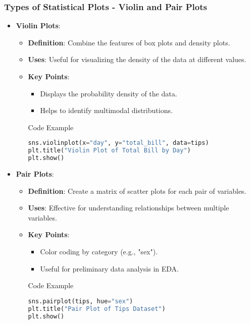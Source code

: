 \documentclass[aspectratio=169]{beamer}
\begin{document}
\begin{frame}[fragile]
    \frametitle{Types of Statistical Plots - Violin and Pair Plots}
    \begin{itemize}
        \item \textbf{Violin Plots}:
            \begin{itemize}
                \item \textbf{Definition}: Combine the features of box plots and density plots.
                \item \textbf{Uses}: Useful for visualizing the density of the data at different values.
                \item \textbf{Key Points}:
                    \begin{itemize}
                        \item Displays the probability density of the data.
                        \item Helps to identify multimodal distributions.
                    \end{itemize}
                
                \begin{block}{Code Example}
                \begin{lstlisting}[language=Python]
sns.violinplot(x="day", y="total_bill", data=tips)
plt.title("Violin Plot of Total Bill by Day")
plt.show()
                \end{lstlisting}
                \end{block}
            \end{itemize}
        
        \item \textbf{Pair Plots}:
            \begin{itemize}
                \item \textbf{Definition}: Create a matrix of scatter plots for each pair of variables.
                \item \textbf{Uses}: Effective for understanding relationships between multiple variables.
                \item \textbf{Key Points}:
                    \begin{itemize}
                        \item Color coding by category (e.g., "sex").
                        \item Useful for preliminary data analysis in EDA.
                    \end{itemize}
                
                \begin{block}{Code Example}
                \begin{lstlisting}[language=Python]
sns.pairplot(tips, hue="sex")
plt.title("Pair Plot of Tips Dataset")
plt.show()
                \end{lstlisting}
                \end{block}
            \end{itemize}
    \end{itemize}
\end{frame}
\end{document}

